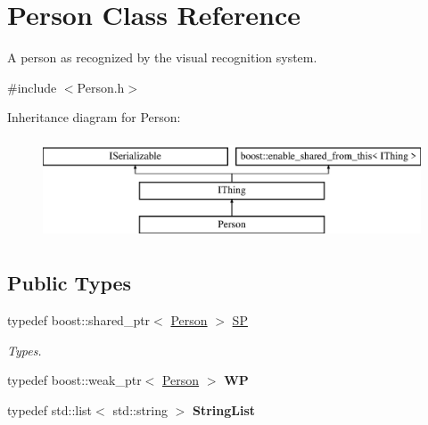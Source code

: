 \hypertarget{class_person}{}\section{Person Class Reference}
\label{class_person}


A person as recognized by the visual recognition system.  




{\ttfamily \#include $<$Person.\+h$>$}

Inheritance diagram for Person\+:\begin{figure}[H]
\begin{center}
\leavevmode
\includegraphics[height=3.000000cm]{class_person}
\end{center}
\end{figure}
\subsection*{Public Types}
\begin{DoxyCompactItemize}
\item 
\mbox{\label{class_person_a16426d961e9ca63d2524812444163d36}} 
typedef boost\+::shared\+\_\+ptr$<$ \hyperlink{class_person}{Person} $>$ \hyperlink{class_person_a16426d961e9ca63d2524812444163d36}{SP}
\begin{DoxyCompactList}\small\item\em Types. \end{DoxyCompactList}\item 
\mbox{\label{class_person_ae91542016d2e03d1fa9e37ed95b1dcd6}} 
typedef boost\+::weak\+\_\+ptr$<$ \hyperlink{class_person}{Person} $>$ {\bfseries WP}
\item 
\mbox{\label{class_person_ac27922315c4a377e9f45a12ec6f854e8}} 
typedef std\+::list$<$ std\+::string $>$ {\bfseries String\+List}
\end{DoxyCompactItemize}
